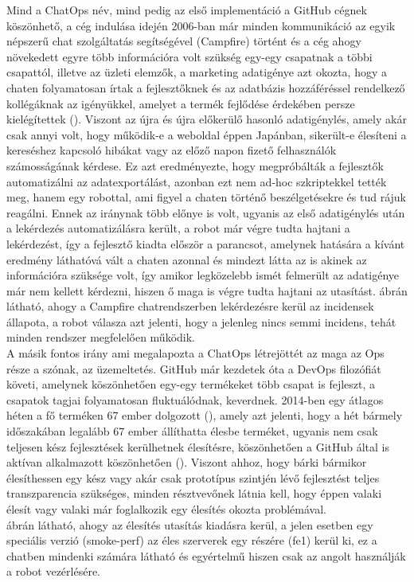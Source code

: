 Mind a ChatOps név, mind pedig az első implementáció a GitHub cégnek köszönhető, a cég indulása idején 2006-ban már minden kommunikáció az egyik népszerű chat szolgáltatás segítségével (Campfire) történt és a cég ahogy növekedett egyre több információra volt szükség egy-egy csapatnak a többi csapattól, illetve az üzleti elemzők, a marketing adatigénye azt okozta, hogy a chaten folyamatosan írtak a fejlesztőknek és az adatbázis hozzáféréssel rendelkező kollégáknak az igényükkel, amelyet a termék fejlődése érdekében persze kielégítettek (\cite{what_is_chatops_slideshow}). Viszont az újra és újra előkerülő hasonló adatigénylés, amely akár csak annyi volt, hogy működik-e a weboldal éppen Japánban, sikerült-e élesíteni a kereséshez kapcsoló hibákat vagy az előző napon fizető felhasználók számosságának kérdese. Ez azt eredményezte, hogy megpróbálták a fejlesztők automatizálni az adatexportálást, azonban ezt nem ad-hoc szkriptekkel tették meg, hanem egy robottal, ami figyel a chaten történő beszélgetésekre és tud rájuk reagálni. Ennek az iránynak több előnye is volt, ugyanis az első adatigénylés után a lekérdezés automatizálásra került, a robot már végre tudta hajtani a lekérdezést, így a fejlesztő kiadta először a parancsot, amelynek hatására a kívánt eredmény láthatóvá vált a chaten azonnal és mindezt látta az is akinek az információra szüksége volt, így amikor legközelebb ismét felmerült az adatigénye már nem kellett kérdezni, hiszen ő maga is végre tudta hajtani az utasítást.  ábrán látható, ahogy a Campfire chatrendszerben lekérdezésre kerül az incidensek állapota, a robot válasza azt jelenti, hogy a jelenleg nincs semmi incidens, tehát minden rendszer megfelelően működik. \\
A másik fontos irány ami megalapozta a ChatOps létrejöttét az maga az Ops része a szónak, az üzemeltetés. GitHub már kezdetek óta a DevOps filozófiát követi, amelynek köszönhetően egy-egy termékeket több csapat is fejleszt, a csapatok tagjai folyamatosan fluktuálódnak, keverdnek.  2014-ben egy átlagos héten a fő terméken 67 ember dolgozott (\cite{github_product_team}), amely azt jelenti, hogy a hét bármely időszakában legalább 67 ember állíthatta élesbe terméket, ugyanis nem csak teljesen kész fejlesztések kerülhetnek élesítésre, köszönhetően a GitHub által is aktívan alkalmazott  köszönhetően (\cite{github_feature_flag}). Viszont ahhoz, hogy bárki bármikor élesíthessen egy kész vagy akár csak prototípus szintjén lévő fejlesztést teljes transzparencia szükséges, minden résztvevőnek látnia kell, hogy éppen valaki élesít vagy valaki már foglalkozik egy élesítés okozta problémával.\\
 ábrán látható, ahogy az élesítés utasítás kiadásra kerül, a jelen esetben egy speciális verzió (smoke-perf) az éles szerverek egy részére (fe1) kerül ki, ez a chatben mindenki számára látható és egyértelmű hiszen csak az angolt használják a robot vezérlésére.

